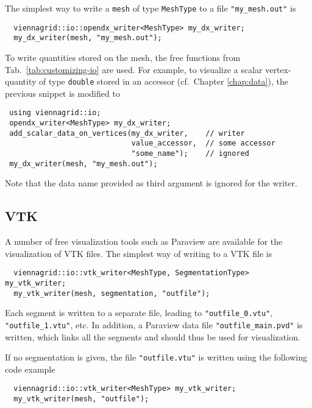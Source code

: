  The simplest way to write a \lstinline|mesh| of type \lstinline|MeshType| to a file \lstinline|"my_mesh.out"| is
 \begin{lstlisting}
  viennagrid::io::opendx_writer<MeshType> my_dx_writer;
  my_dx_writer(mesh, "my_mesh.out");
 \end{lstlisting}

 \pagebreak

 To write quantities stored on the mesh, the free functions from Tab.~\ref{tab:customizing-io} are used.
 For example, to visualize a scalar vertex-quantity of type \lstinline|double| stored in an accessor (cf.~Chapter \ref{chap:data}), the previous snippet is modified to
 \begin{lstlisting}
 using viennagrid::io;
 opendx_writer<MeshType> my_dx_writer;
 add_scalar_data_on_vertices(my_dx_writer,    // writer
                             value_accessor,  // some accessor
                             "some_name");    // ignored
 my_dx_writer(mesh, "my_mesh.out");
 \end{lstlisting}
 Note that the data name provided as third argument is ignored for the {\OpenDX} writer.


 \subsection{VTK}
 A number of free visualization tools such as Paraview \cite{paraview} are available for the visualization of VTK files.
 The simplest way of writing to a VTK file is
 \begin{lstlisting}
  viennagrid::io::vtk_writer<MeshType, SegmentationType> my_vtk_writer;
  my_vtk_writer(mesh, segmentation, "outfile");
 \end{lstlisting}
 Each segment is written to a separate file, leading to \lstinline|"outfile_0.vtu"|, \lstinline|"outfile_1.vtu"|, etc. In addition,
 a Paraview data file \lstinline|"outfile_main.pvd"| is written, which links all the segments and should thus be used for visualization.

 If no segmentation is given, the file \lstinline|"outfile.vtu"| is written using the following code example
 \begin{lstlisting}
  viennagrid::io::vtk_writer<MeshType> my_vtk_writer;
  my_vtk_writer(mesh, "outfile");
 \end{lstlisting}

